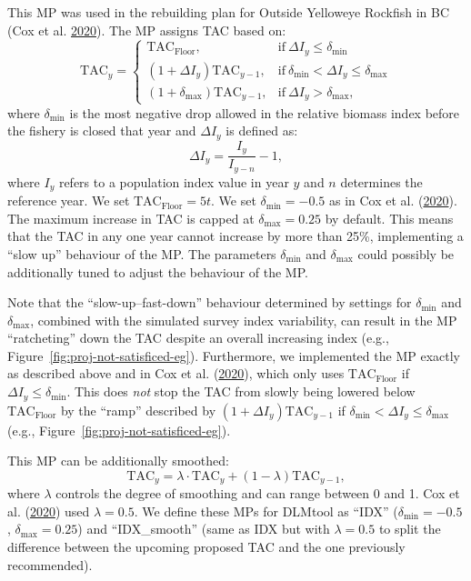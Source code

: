 \documentclass[11pt]{book}
\begin{document}
This MP was used in the rebuilding plan for Outside Yelloweye Rockfish in BC (Cox et al. \protect\hyperlink{ref-cox2020}{2020}). The MP assigns TAC based on:
\begin{equation}
\textrm{TAC}_y =
\begin{cases}
\textrm{TAC}_\textrm{Floor}, & \textrm{if}\ \Delta I_y \leq \delta_\textrm{min} \\
(1 + \Delta I_y ) \textrm{TAC}_{y-1}, & \textrm{if}\ \delta_\textrm{min} \lt \Delta I_y \leq \delta_\textrm{max} \\
(1 + \delta_\textrm{max}) \textrm{TAC}_{y-1}, & \textrm{if}\ \Delta I_y \gt \delta_\textrm{max},
\end{cases}
\end{equation}
where \(\delta_\textrm{min}\) is the most negative drop allowed in the relative biomass index before the fishery is closed that year and \(\Delta I_y\) is defined as:
\begin{equation}
\Delta I_y = \frac{I_y}{I_{y-n}} - 1,
\end{equation}
where \(I_y\) refers to a population index value in year \(y\) and \(n\) determines the reference year. We set \(\textrm{TAC}_\textrm{Floor} = 5 t\). We set \(\delta_\textrm{min} = -0.5\) as in Cox et al. (\protect\hyperlink{ref-cox2020}{2020}). The maximum increase in TAC is capped at \(\delta_\textrm{max} = 0.25\) by default. This means that the TAC in any one year cannot increase by more than 25\%, implementing a ``slow up'' behaviour of the MP. The parameters \(\delta_\textrm{min}\) and \(\delta_\textrm{max}\) could possibly be additionally tuned to adjust the behaviour of the MP.

Note that the ``slow-up--fast-down'' behaviour determined by settings for \(\delta_\textrm{min}\) and \(\delta_\textrm{max}\), combined with the simulated survey index variability, can result in the MP ``ratcheting'' down the TAC despite an overall increasing index (e.g., Figure~\ref{fig:proj-not-satisficed-eg}). Furthermore, we implemented the MP exactly as described above and in Cox et al. (\protect\hyperlink{ref-cox2020}{2020}), which only uses \(\textrm{TAC}_\textrm{Floor}\) if \(\Delta I_y \leq \delta_\textrm{min}\). This does \emph{not} stop the TAC from slowly being lowered below \(\textrm{TAC}_\textrm{Floor}\) by the ``ramp'' described by \((1 + \Delta I_y ) \textrm{TAC}_{y-1}\) if \(\delta_\textrm{min} \lt \Delta I_y \leq \delta_\textrm{max}\) (e.g., Figure~\ref{fig:proj-not-satisficed-eg}).

This MP can be additionally smoothed:
\begin{equation}
\textrm{TAC}_y = \lambda \cdot \textrm{TAC}_y + (1-\lambda) \textrm{TAC}_{y-1},
\end{equation}
where \(\lambda\) controls the degree of smoothing and can range between 0 and 1. Cox et al. (\protect\hyperlink{ref-cox2020}{2020}) used \(\lambda=0.5\). We define these MPs for DLMtool as ``IDX'' (\(\delta_{\textrm{min}} = -0.5\), \(\delta_{\textrm{max}} = 0.25\)) and ``IDX\_smooth'' (same as IDX but with \(\lambda = 0.5\) to split the difference between the upcoming proposed TAC and the one previously recommended).
\end{document}
